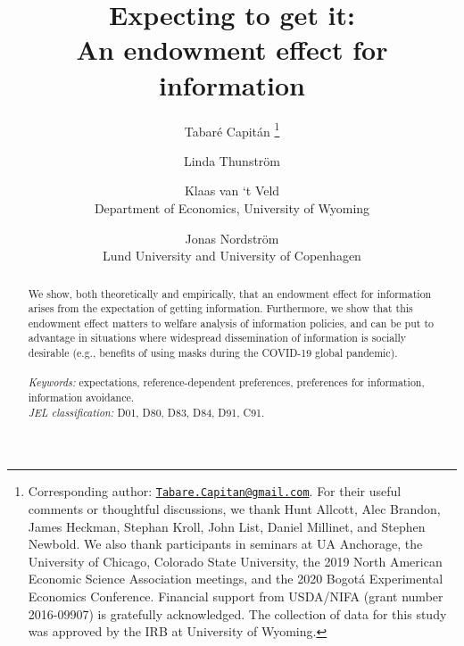 
\title{\vspace{-3cm}
      Expecting to get it: \\ An endowment effect for information
      }


\author{Tabaré Capitán
          \thanks{Corresponding author: \href{mailto:Tabare.Capitan@gmail.com}{\texttt{Tabare.Capitan@gmail.com}}. For their useful comments or thoughtful discussions, we thank Hunt Allcott, Alec Brandon, James Heckman, Stephan Kroll, John List, Daniel Millinet, and Stephen Newbold. We also thank participants in seminars at UA Anchorage, the University of Chicago, Colorado State University, the 2019 North American Economic Science Association meetings, and the 2020 Bogotá Experimental Economics Conference. Financial support from USDA/NIFA (grant number 2016-09907) is gratefully acknowledged. The collection of data for this study was approved by the IRB at University of Wyoming.}
        \and
        Linda Thunström
        \and
        Klaas van ‘t Veld
          \\ \small{Department of Economics, University of Wyoming}
        \and
        Jonas Nordström
          \\ \small{Lund University and University of Copenhagen}
        }

\maketitle

\thispagestyle{empty}   %

\begin{abstract}

\noindent
We show, both theoretically and empirically, that an endowment effect for information arises from the expectation of getting information. Furthermore, we show that this endowment effect matters to welfare analysis of information policies, and can be put to advantage in situations where widespread dissemination of information is socially desirable (e.g., benefits of using masks during the COVID-19 global pandemic).
\\
\\
\textit{Keywords:} expectations, reference-dependent preferences, preferences for information, information avoidance.
\\
\textit{JEL classification:} D01, D80, D83, D84, D91, C91.

\end{abstract}

\clearpage

